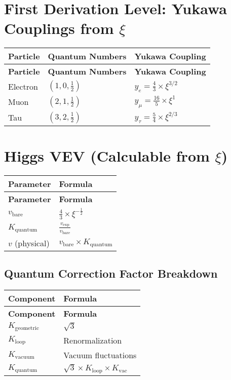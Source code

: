 \documentclass[12pt,a4paper]{article}
\begin{document}
	\section{First Derivation Level: Yukawa Couplings from $\xi$}
	\begin{longtable}{|p{3cm}|p{3cm}|p{5cm}|}
		\hline
		\textbf{Particle} & \textbf{Quantum Numbers} & \textbf{Yukawa Coupling} \\
		\hline
		\endfirsthead
		\hline
		\textbf{Particle} & \textbf{Quantum Numbers} & \textbf{Yukawa Coupling} \\
		\hline
		\endhead
		Electron & $(1,0,\frac{1}{2})$ & $y_e = \frac{4}{3} \times \xi^{3/2}$ \\
		\hline
		Muon & $(2,1,\frac{1}{2})$ & $y_{\mu} = \frac{16}{5} \times \xi^{1}$ \\
		\hline
		Tau & $(3,2,\frac{1}{2})$ & $y_{\tau} = \frac{5}{4} \times \xi^{2/3}$ \\
		\hline
	\end{longtable}
	
	\section{Higgs VEV (Calculable from $\xi$)}
	\begin{longtable}{|p{5cm}|p{6cm}|}
		\hline
		\textbf{Parameter} & \textbf{Formula} \\
		\hline
		\endfirsthead
		\hline
		\textbf{Parameter} & \textbf{Formula} \\
		\hline
		\endhead
		$v_{\text{bare}}$ & $\frac{4}{3} \times \xi^{-\frac{1}{2}}$ \\
		\hline
		$K_{\text{quantum}}$ & $\frac{v_{\text{exp}}}{v_{\text{bare}}}$ \\
		\hline
		$v$ (physical) & $v_{\text{bare}} \times K_{\text{quantum}}$ \\
		\hline
	\end{longtable}
	
	\subsection{Quantum Correction Factor Breakdown}
	\begin{longtable}{|p{5cm}|p{6cm}|}
		\hline
		\textbf{Component} & \textbf{Formula} \\
		\hline
		\endfirsthead
		\hline
		\textbf{Component} & \textbf{Formula} \\
		\hline
		\endhead
		$K_{\text{geometric}}$ & $\sqrt{3}$ \\
		\hline
		$K_{\text{loop}}$ & Renormalization \\
		\hline
		$K_{\text{vacuum}}$ & Vacuum fluctuations \\
		\hline
		$K_{\text{quantum}}$ & $\sqrt{3} \times K_{\text{loop}} \times K_{\text{vac}}$ \\
		\hline
	\end{longtable}
	
\end{document}
